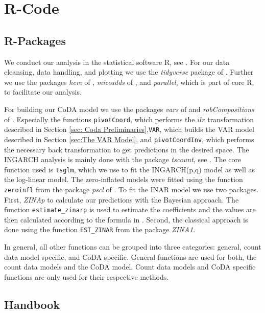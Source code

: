 \section{R-Code}
\label{sec:R-Code}

\subsection{R-Packages}
\label{sec:R-Packages}

We conduct our analysis in the statistical software R, see \textcite{R:2022}. For our data cleansing, data handling, and plotting we use the \textit{tidyverse} package of \textcite{Tidyverse:2019}. Further we use the packages \textit{here} of \textcite{here:2020}, \textit{miceadds} of \textcite{Miceadds:2023}, and \textit{parallel}, which is part of core R, to facilitate our analysis.  

For building our CoDA model we use the packages \textit{vars} of \textcite{VAR:2008,CoDAR2:2008} and \textit{robCompositions} of \textcite{RobComp:2011,CoDAR4:2018}. Especially the functions \texttt{pivotCoord}, which performs the $ilr$ transformation described in Section \ref{sec: Coda Preliminaries},\texttt{VAR}, which builds the VAR model described in Section \ref{sec:The VAR Model}, and \texttt{pivotCoordInv}, which performs the necessary back transformation to get predictions in the desired space. The INGARCH analysis is mainly done with the package \textit{tscount}, see \textcite{Tscount:2017,Tscount:2020}. The core function used is \texttt{tsglm}, which we use to fit the INGARCH(p,q) model as well as the log-linear model. The zero-inflated models were fitted using the function \texttt{zeroinfl} from the package \textit{pscl} of \textcite{Pscl:2008}. To fit the INAR model we use two packages. First, \textit{ZINAp} to calculate our predictions with the Bayesian approach. The function \texttt{estimate\_zinarp} is used to estimate the coefficients and the values are then calculated according to the formula in \textcite{Silva:2009}. Second, the classical approach is done using the function \texttt{EST\_ZINAR} from the package \textit{ZINA1}. %

In general, all other functions can be grouped into three categories: general, count data model specific, and CoDA specific. General functions are used for both, the count data models and the CoDA model. Count data models and CoDA specific functions are only used for their respective methods.
\subsection{Handbook}
\label{sec:Handbook}

